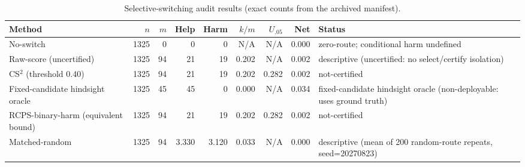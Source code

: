 \begin{table}[t]
\centering
\caption{Selective-switching audit results (exact counts from the archived manifest).}
\label{tab:cs2_main}
\begin{tabular}{lrrrrrrrl}
\toprule
Method & $n$ & $m$ & Help & Harm & $k/m$ & $U_{.05}$ & Net & Status \\
\midrule
No-switch & 1325 & 0 & 0 & 0 & N/A & N/A & 0.000 & zero-route; conditional harm undefined \\
Raw-score (uncertified) & 1325 & 94 & 21 & 19 & 0.202 & N/A & 0.002 & descriptive (uncertified: no select/certify isolation) \\
CS$^2$ (threshold 0.40) & 1325 & 94 & 21 & 19 & 0.202 & 0.282 & 0.002 & not-certified \\
Fixed-candidate hindsight oracle & 1325 & 45 & 45 & 0 & 0.000 & N/A & 0.034 & fixed-candidate hindsight oracle (non-deployable: uses ground truth) \\
RCPS-binary-harm (equivalent bound) & 1325 & 94 & 21 & 19 & 0.202 & 0.282 & 0.002 & not-certified \\
Matched-random & 1325 & 94 & 3.330 & 3.120 & 0.033 & N/A & 0.000 & descriptive (mean of 200 random-route repeats, seed=20270823) \\
\bottomrule
\end{tabular}
\end{table}
